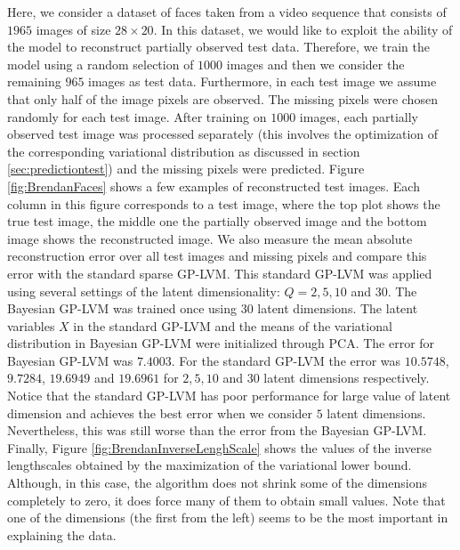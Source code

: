 \documentclass[twoside,times]{article}
\begin{document}
Here, we consider a dataset of faces \citep{Roweis:global01} taken
from a video sequence that consists of $1965$ images of size $28
\times 20$. In this dataset, we would like to exploit the ability of
the model to reconstruct partially observed test data. Therefore, we
train the model using a random selection of $1000$ images and then we
consider the remaining $965$ images as test data. Furthermore, in each
test image we assume that only half of the image pixels are
observed. The missing pixels were chosen randomly for each test
image. After training on $1000$ images, each partially observed test
image was processed separately (this involves the optimization of the
corresponding variational distribution as discussed in section
\ref{sec:predictiontest}) and the missing pixels were
predicted. Figure \ref{fig:BrendanFaces} shows a few examples of
reconstructed test images.  Each column in this figure corresponds to
a test image, where the top plot shows the true test image, the middle
one the partially observed image and the bottom image shows the
reconstructed image.  We also measure the mean absolute reconstruction
error over all test images and missing pixels and compare this error
with the standard sparse GP-LVM. This standard GP-LVM was applied
using several settings of the latent dimensionality: $Q=2,5,10$ and
$30$. The Bayesian GP-LVM was trained once using $30$ latent
dimensions. The latent variables $X$ in the standard GP-LVM and the
means of the variational distribution in Bayesian GP-LVM were
initialized through PCA.  The error for Bayesian GP-LVM was
$7.4003$. For the standard GP-LVM the error was $10.5748$, $9.7284$,
$19.6949$ and $19.6961$ for $2, 5, 10$ and $30$ latent dimensions
respectively. Notice that the standard GP-LVM has poor performance for
large value of latent dimension and achieves the best error when we
consider $5$ latent dimensions. Nevertheless, this was still worse
than the error from the Bayesian GP-LVM. Finally, Figure
\ref{fig:BrendanInverseLenghScale} shows the values of the
inverse lengthscales obtained by the maximization of the variational
lower bound. Although, in this case, the algorithm does not shrink
some of the dimensions completely to zero, it does force many of them
to obtain small values. Note that one of the dimensions (the
first from the left) seems to be the most important in
explaining the data.
\end{document}
